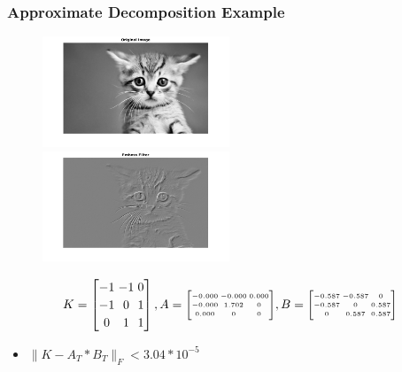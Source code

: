 \documentclass{beamer}
\begin{document}
\begin{frame}
\frametitle{Approximate Decomposition Example}
\begin{figure}[htb]
  \begin{center}
  \mbox{\includegraphics[height=1.3in]{kitten.png}}
   \mbox{\includegraphics[height=1.3in]{kitten_Emboss.png}}
   
\end{center}
\end{figure}

$$
\arraycolsep=1.5pt\def\arraystretch{1.2}
K=\begin{bmatrix}
    -1 &   -1   &  0 \\
    -1   &  0   &  1 \\
     0   &  1  &   1
\end{bmatrix},
\arraycolsep=1.0pt\def\arraystretch{1.2}
A=
\tiny
{\begin{bmatrix}
  -0.000  & -0.000   & 0.000 \\
   -0.000   & 1.702  &  0 \\ 
    0.000    &     0   &      0
\end{bmatrix}}
,
B=
\tiny{\begin{bmatrix}

   -0.587 &  -0.587   &      0\\
   -0.587  &       0  &  0.587\\
         0   & 0.587 &   0.587
\end{bmatrix}}
$$
\begin{itemize}
\item
$\|K-A_T*B_T\|_F < 3.04*10^{-5}$
\end{itemize}

\end{frame}
\end{document}
